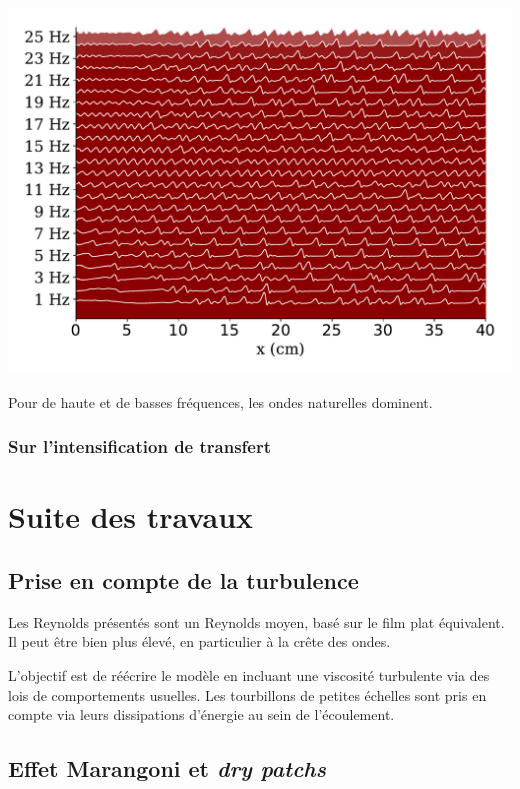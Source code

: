\documentclass[a0,portrait]{a0poster}
\begin{document}
\begin{multicols}{2}
\begin{multicols}{2}
        \begin{center}
            \includegraphics[width=0.98\columnwidth]{01-frequency_effect}
            \label{fig:thermal}
        \end{center}

        Pour de haute et de basses fréquences, les ondes naturelles dominent.
        \columnbreak

        \subsubsection*{Sur l'intensification de transfert}
    \end{multicols}

    \section*{Suite des travaux}

    \begin{multicols}{2}
        \subsection*{Prise en compte de la turbulence}
        Les Reynolds présentés sont un Reynolds moyen, basé sur le film plat équivalent. Il peut être bien plus élevé, en particulier à la crête des ondes.

        L'objectif est de réécrire le modèle en incluant une viscosité turbulente via des lois de comportements usuelles. Les tourbillons de petites échelles sont pris en compte via leurs dissipations d'énergie au sein de l'écoulement.
        \columnbreak

        \subsection*{Effet Marangoni et \emph{dry patchs}}
    \end{multicols}

\end{multicols}
\end{document}
